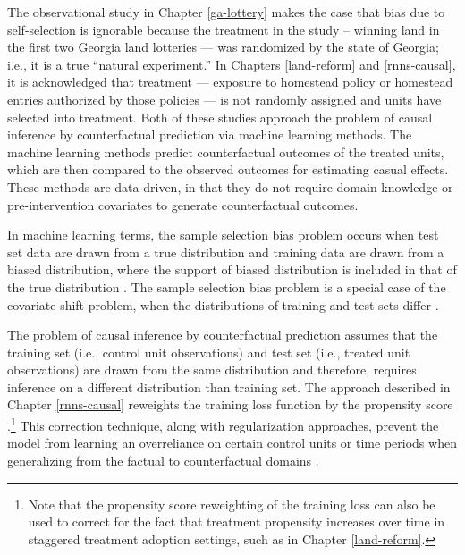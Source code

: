 The observational study in Chapter \ref{ga-lottery} makes the case that bias due to self-selection is ignorable because the treatment in the study -- winning land in the first two Georgia land lotteries --- was randomized by the state of Georgia; i.e., it is a true ``natural experiment.'' In Chapters \ref{land-reform} and \ref{rnns-causal}, it is acknowledged that treatment --- exposure to homestead policy or homestead entries authorized by those policies --- is not randomly assigned and units have selected into treatment. Both of these studies approach the problem of causal inference by counterfactual prediction via machine learning methods. The machine learning methods predict counterfactual outcomes of the treated units, which are then compared to the observed outcomes for estimating casual effects. These methods are data-driven, in that they do not require domain knowledge or pre-intervention covariates to generate counterfactual outcomes.  

In machine learning terms, the sample selection bias problem occurs when test set data are drawn from a true distribution and training data are drawn from a biased distribution, where the support of biased distribution is included in that of the true distribution \citep{cortes2008sample}. The sample selection bias problem is a special case of the covariate shift problem, when the distributions of training and test sets differ \citep{bickel2007discriminative}. 

The problem of causal inference by counterfactual prediction assumes that the training set (i.e., control unit observations) and test set (i.e., treated unit observations) are drawn from the same distribution and therefore, requires inference on a different distribution than training set. The approach described in Chapter \ref{rnns-causal} reweights the training loss function by the propensity score \citep{rosenbaum1983central}.\footnote{Note that the propensity score reweighting of the training loss can also be used to correct for the fact that treatment propensity increases over time in staggered treatment adoption settings, such as in Chapter \ref{land-reform}.} This correction technique, along with regularization approaches, prevent the model from learning an overreliance on certain control units or time periods when generalizing from the factual to counterfactual domains \citep{johansson2016learning}.
	